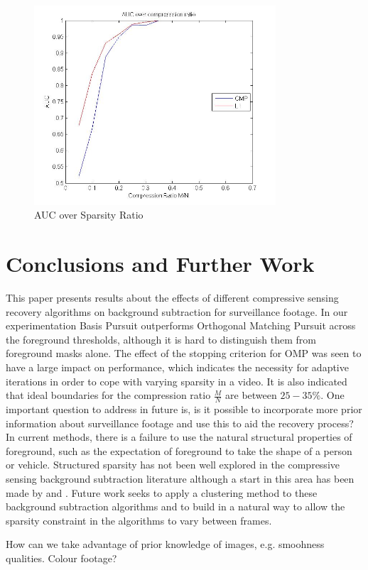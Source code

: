 \begin{figure}[t]
  \centering
  \includegraphics[width = 9cm]{AUCcompressionRatio}
  \caption{AUC over Sparsity Ratio}
  \label{fig:sr}
\end{figure}


\section{Conclusions and Further Work}\label{sec:conclusions}
This paper presents results about the effects of different compressive sensing recovery algorithms on background subtraction for surveillance footage. In our experimentation Basis Pursuit outperforms Orthogonal Matching Pursuit across the foreground thresholds, although it is hard to distinguish them from foreground masks alone.  The effect of the stopping criterion for OMP was seen to have a large impact on performance, which indicates the necessity for adaptive iterations in order to cope with varying sparsity in a video. It is also indicated that ideal boundaries for the compression ratio $\frac{M}{N}$ are between $25 - 35\%$.  One important question to address in future is, is it possible to incorporate more prior information about surveillance footage and use this to aid the recovery process? In current methods, there is a failure to use the natural structural properties of foreground, such as the expectation of foreground to take the shape of a person or vehicle. Structured sparsity has not been well explored in the compressive sensing background subtraction literature although a start in this area has been made by \cite{La2006} and \cite{Duarte2008}. Future work seeks to apply a clustering method to these background subtraction algorithms and to build in a natural way to allow the sparsity constraint in the algorithms to vary between frames. 

How can we take advantage of prior knowledge of images, e.g. smoohness qualities.
Colour footage? 


%	
%		
%								

